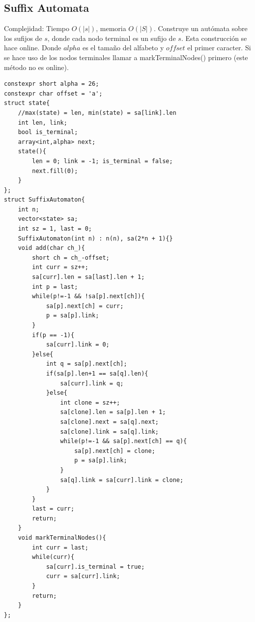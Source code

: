 \documentclass[10pt,spanish,mexico]{article}
\numberwithin{equation}{section}
\begin{document}
\begin{multicols}{2}
\subsection{Suffix Automata}
Complejidad: Tiempo $O(|s|)$, memoria $O(|S|)$. Construye un autómata sobre los sufijos de $s$, donde cada nodo terminal es un sufijo de $s$. Esta construcción se hace online. Donde $alpha$ es el tamaño del alfabeto y $offset$ el primer caracter. Si se hace uso de los nodos terminales llamar a markTerminalNodes() primero (este método no es online).
\begin{verbatim}
constexpr short alpha = 26;
constexpr char offset = 'a';
struct state{
    //max(state) = len, min(state) = sa[link].len
    int len, link;
    bool is_terminal;
    array<int,alpha> next;
    state(){
        len = 0; link = -1; is_terminal = false;
        next.fill(0);
    }
};
struct SuffixAutomaton{
    int n;
    vector<state> sa;
    int sz = 1, last = 0;
    SuffixAutomaton(int n) : n(n), sa(2*n + 1){}
    void add(char ch_){
        short ch = ch_-offset;
        int curr = sz++;
        sa[curr].len = sa[last].len + 1;
        int p = last;
        while(p!=-1 && !sa[p].next[ch]){
            sa[p].next[ch] = curr;
            p = sa[p].link;
        }
        if(p == -1){
            sa[curr].link = 0;
        }else{
            int q = sa[p].next[ch];
            if(sa[p].len+1 == sa[q].len){
                sa[curr].link = q;
            }else{
                int clone = sz++;
                sa[clone].len = sa[p].len + 1;
                sa[clone].next = sa[q].next;
                sa[clone].link = sa[q].link;
                while(p!=-1 && sa[p].next[ch] == q){
                    sa[p].next[ch] = clone;
                    p = sa[p].link;
                }
                sa[q].link = sa[curr].link = clone;
            }
        }
        last = curr;
        return;
    }
    void markTerminalNodes(){
        int curr = last;
        while(curr){
            sa[curr].is_terminal = true;
            curr = sa[curr].link;
        }
        return;
    }
};
\end{verbatim}

\vspace{-1.2\baselineskip}
\hrulefill

\end{multicols}
\end{document}
